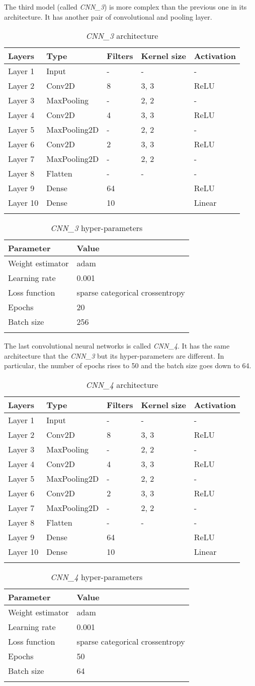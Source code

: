 The third model (called \emph{CNN\_3}) is more complex than the previous
one in its architecture. It has another pair of convolutional and
pooling layer.

\begin{longtable}[]{@{}lllll@{}}
	\toprule
	\textbf{Layers} & \textbf{Type} & \textbf{Filters} & \textbf{Kernel size} &
	\textbf{Activation}\tabularnewline
	\midrule
	\endhead
	Layer 1 & Input & - & - & -\tabularnewline
	Layer 2 & Conv2D & 8 & 3, 3 & ReLU\tabularnewline
	Layer 3 & MaxPooling & - & 2, 2 & -\tabularnewline
	Layer 4 & Conv2D & 4 & 3, 3 & ReLU\tabularnewline
	Layer 5 & MaxPooling2D & - & 2, 2 & -\tabularnewline
	Layer 6 & Conv2D & 2 & 3, 3 & ReLU\tabularnewline
	Layer 7 & MaxPooling2D & - & 2, 2 & -\tabularnewline
	Layer 8 & Flatten & - & - & -\tabularnewline
	Layer 9 & Dense & 64 & & ReLU\tabularnewline
	Layer 10 & Dense & 10 & & Linear\tabularnewline
	\bottomrule
		\caption{\emph{CNN\_3} architecture}
\end{longtable}

\begin{longtable}[]{@{}ll@{}}
	\toprule
	\textbf{Parameter} & \textbf{Value}\tabularnewline
	\midrule
	\endhead
	Weight estimator & adam\tabularnewline
	Learning rate & 0.001\tabularnewline
	Loss function & sparse categorical crossentropy\tabularnewline
	Epochs & 20\tabularnewline
	Batch size & 256\tabularnewline
	\bottomrule
		\caption{\emph{CNN\_3} hyper-parameters}
\end{longtable}

\newpage

The last convolutional neural networks is called \emph{CNN\_4}. It has
the same architecture that the \emph{CNN\_3} but its hyper-parameters
are different. In particular, the number of epochs rises to 50 and the
batch size goes down to 64.

\begin{longtable}[]{@{}lllll@{}}
	\toprule
	\textbf{Layers} & \textbf{Type} & \textbf{Filters} & \textbf{Kernel size} &
	\textbf{Activation}\tabularnewline
	\midrule
	\endhead
	Layer 1 & Input & - & - & -\tabularnewline
	Layer 2 & Conv2D & 8 & 3, 3 & ReLU\tabularnewline
	Layer 3 & MaxPooling & - & 2, 2 & -\tabularnewline
	Layer 4 & Conv2D & 4 & 3, 3 & ReLU\tabularnewline
	Layer 5 & MaxPooling2D & - & 2, 2 & -\tabularnewline
	Layer 6 & Conv2D & 2 & 3, 3 & ReLU\tabularnewline
	Layer 7 & MaxPooling2D & - & 2, 2 & -\tabularnewline
	Layer 8 & Flatten & - & - & -\tabularnewline
	Layer 9 & Dense & 64 & & ReLU\tabularnewline
	Layer 10 & Dense & 10 & & Linear\tabularnewline
	\bottomrule
		\caption{\emph{CNN\_4} architecture}
\end{longtable}

\begin{longtable}[]{@{}ll@{}}
	\toprule
	\textbf{Parameter} & \textbf{Value}\tabularnewline
	\midrule
	\endhead
	Weight estimator & adam\tabularnewline
	Learning rate & 0.001\tabularnewline
	Loss function & sparse categorical crossentropy\tabularnewline
	Epochs & 50\tabularnewline
	Batch size & 64\tabularnewline
	\bottomrule
		\caption{\emph{CNN\_4} hyper-parameters}
\end{longtable}